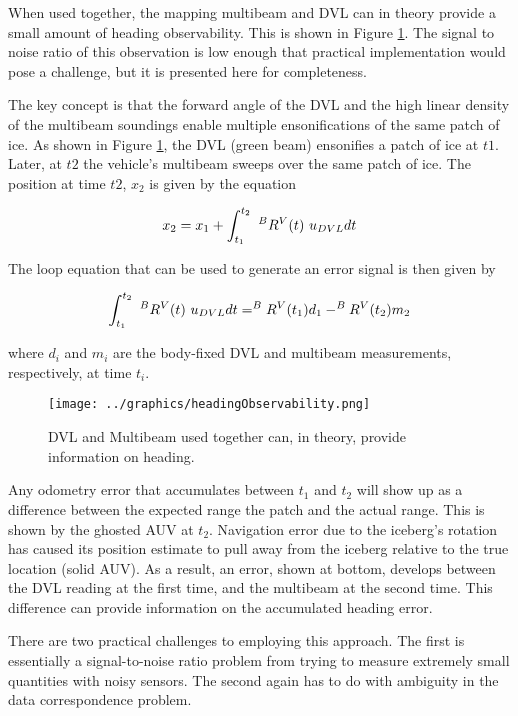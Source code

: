 When used together, the mapping multibeam and DVL can in theory provide a small amount of heading observability. This is shown in Figure \ref{fig:headingObservability}. The signal to noise ratio of this observation is low enough that practical implementation would pose a challenge, but it is presented here for completeness.

The key concept is that the forward angle of the DVL and the high linear density of the multibeam soundings  enable multiple ensonifications of the same patch of ice. As shown in Figure \ref{fig:headingObservability}, the DVL (green beam) ensonifies a patch of ice at $t1$. Later, at $t2$ the vehicle's multibeam sweeps over the same patch of ice. The position at time $t2$, $x_2$ is given by the equation

\begin{align}
x_2 = x_1 + \int_{t_1}^{t_2}~^BR^V(t)~u_{\tiny{DVL}}dt
\end{align}

The loop equation that can be used to generate an error signal is then given by

\begin{align}
\int_{t_1}^{t_2}~^BR^V(t)~u_{\tiny{DVL}}dt = ^BR^V(t_1)d_1 -  ^BR^V(t_2)m_2
\end{align}

where $d_i$ and $m_i$ are the body-fixed DVL and multibeam measurements, respectively, at time $t_i$.

\begin{figure}[h]
   \centering
   \texttt{[image: ../graphics/headingObservability.png]} %
   \caption{DVL and Multibeam used together can, in theory, provide information on heading.}
   \label{fig:headingObservability}
\end{figure}

Any odometry error that accumulates between $t_1$ and $t_2$ will show up as a difference between the expected range the patch and the actual range. This is shown by the ghosted AUV at $t_2$. Navigation error due to the iceberg's rotation has caused its position estimate to pull away from the iceberg relative to the true location (solid AUV). As a result, an error, shown at bottom, develops between the DVL reading at the first time, and the multibeam at the second time. This difference can provide information on the accumulated heading error.

There are two practical challenges to employing this approach. The first is essentially a signal-to-noise ratio problem from trying to measure extremely small quantities with noisy sensors. The second again has to do with ambiguity in the data correspondence problem. 

